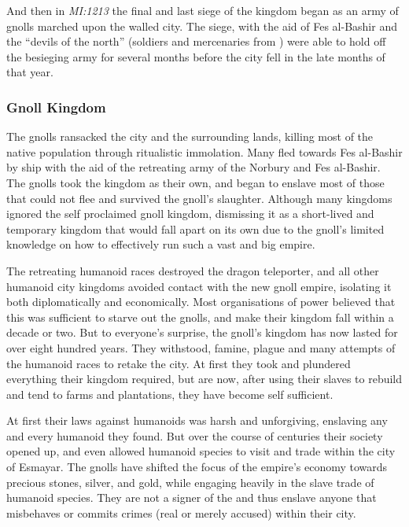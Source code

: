 And then in \emph{MI:1213} the final and last siege of the kingdom began as an
army of gnolls marched upon the walled city. The siege, with the aid of Fes
al-Bashir and the ``devils of the north'' (soldiers and mercenaries from
) were able to hold off the besieging army for several
months before the city fell in the late months of that year.

\subsubsection{Gnoll Kingdom}

The gnolls ransacked the city and the surrounding lands, killing most of the
native population through ritualistic immolation. Many fled towards Fes
al-Bashir by ship with the aid of the retreating army of the Norbury and Fes
al-Bashir. The gnolls took the kingdom as their own, and began to enslave most
of those that could not flee and survived the gnoll's slaughter. Although many
kingdoms ignored the self proclaimed gnoll kingdom, dismissing it as a
short-lived and temporary kingdom that would fall apart on its own due to the
gnoll's limited knowledge on how to effectively run such a vast and big
empire.

The retreating humanoid races destroyed the dragon teleporter, and all other
humanoid city kingdoms avoided contact with the new gnoll empire, isolating it
both diplomatically and economically. Most organisations of power believed
that this was sufficient to starve out the gnolls, and make their kingdom fall
within a decade or two. But to everyone's surprise, the gnoll's kingdom has
now lasted for over eight hundred years. They withstood, famine, plague and
many attempts of the humanoid races to retake the city. At first they took and
plundered everything their kingdom required, but are now, after using their
slaves to rebuild and tend to farms and plantations, they have become self
sufficient.

At first their laws against humanoids was harsh and unforgiving, enslaving any
and every humanoid they found. But over the course of centuries their society
opened up, and even allowed humanoid species to visit and trade within the
city of Esmayar. The gnolls have shifted the focus of the empire's economy
towards precious stones, silver, and gold, while engaging heavily in the slave
trade of humanoid species. They are not a signer of the  and thus enslave anyone that misbehaves or commits crimes (real or
merely accused) within their city.

